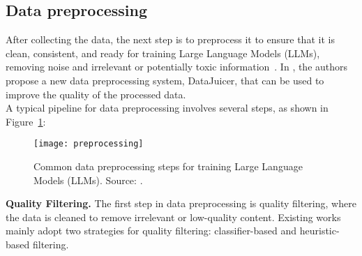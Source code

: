\subsection{Data preprocessing}
\label{subsec:data-preprocessing}

After collecting the data, the next step is to preprocess it to ensure that it is clean, consistent, and ready for training Large Language Models (LLMs), removing noise and irrelevant or potentially toxic information~\cite{chowdhery2022palm, rae2021scaling, longpre2023pretrainer}.
In \textcite{chen2023datajuicer}, the authors propose a new data preprocessing system, DataJuicer, that can be used to improve the quality of the processed data.\\
A typical pipeline for data preprocessing involves several steps, as shown in Figure~\ref{fig:preprocessing}:

\begin{figure}[H]
	\centering
	\texttt{[image: preprocessing]}
	\caption{Common data preprocessing steps for training Large Language Models (LLMs). Source: \textcite{survey}.}
	\label{fig:preprocessing}
\end{figure}

\textbf{Quality Filtering.}
The first step in data preprocessing is quality filtering, where the data is cleaned to remove irrelevant or low-quality content.
Existing works mainly adopt two strategies for quality filtering: classifier-based and heuristic-based filtering.

